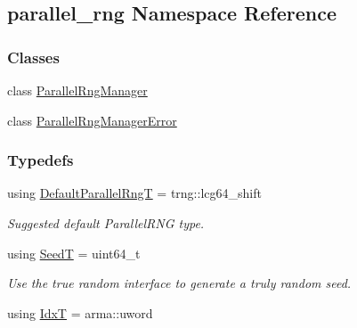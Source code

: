 \hypertarget{namespaceparallel__rng}{}\subsection{parallel\+\_\+rng Namespace Reference}
\label{namespaceparallel__rng}
\subsubsection*{Classes}
\begin{DoxyCompactItemize}
\item 
class \hyperlink{classparallel__rng_1_1ParallelRngManager}{Parallel\+Rng\+Manager}
\item 
class \hyperlink{classparallel__rng_1_1ParallelRngManagerError}{Parallel\+Rng\+Manager\+Error}
\end{DoxyCompactItemize}
\subsubsection*{Typedefs}
\begin{DoxyCompactItemize}
\item 
using \hyperlink{namespaceparallel__rng_a4cb66b089d51a2a89cf6deac41c9b15f}{Default\+Parallel\+RngT} = trng\+::lcg64\+\_\+shift
\begin{DoxyCompactList}\small\item\em Suggested default Parallel\+R\+NG type. \end{DoxyCompactList}\item 
using \hyperlink{namespaceparallel__rng_a462b8721a1aabe3b86582e864640c707}{SeedT} = uint64\+\_\+t
\begin{DoxyCompactList}\small\item\em Use the true random interface to generate a truly random seed. \end{DoxyCompactList}\item 
using \hyperlink{namespaceparallel__rng_aa22fa3e339aee5927780aac099dfc6f3}{IdxT} = arma\+::uword
\end{DoxyCompactItemize}
